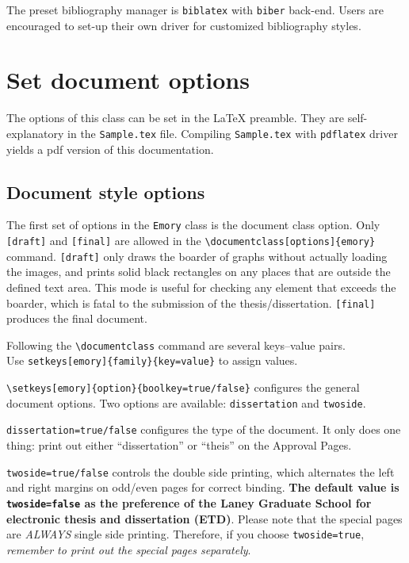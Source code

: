 \documentclass[final]{emory}
\begin{document}
The preset bibliography manager is \Verb|biblatex| with \Verb|biber| back-end. 
Users are encouraged to set-up their own \BibTeX{} driver for customized bibliography styles.


\section{Set document options}\label{sec:options}
The options of this class can be set in the \LaTeX{} preamble. They are 
self-explanatory in the \Verb|Sample.tex| file.
Compiling \Verb|Sample.tex| with \Verb|pdflatex| driver yields a pdf version of this documentation.

\subsection{Document style options}
The first set of options in the \Verb|Emory| class is the document class option.
Only \Verb|[draft]| and \Verb|[final]| are allowed in the 
\Verb|\documentclass[options]{emory}| command.
\Verb|[draft]| only draws the boarder of graphs without actually loading the images,
and prints solid black rectangles on any places that are outside the defined text area. 
This mode is useful for checking any element that exceeds the boarder,
which is fatal to the submission of the thesis/dissertation.
\Verb|[final]| produces the final document. 

Following the \Verb|\documentclass| command are several keys--value pairs.\\
Use \Verb|setkeys[emory]{family}{key=value}| to assign values.

\Verb|\setkeys[emory]{option}{boolkey=true/false}| configures the general document options.
Two options are available: \Verb|dissertation| and \Verb|twoside|.

\Verb|dissertation=true/false| configures the type of the document. 
It only does one thing: print out either ``dissertation'' or ``theis'' on the 
Approval Pages.

\Verb|twoside=true/false| controls the double side printing, which alternates the left and right margins on odd/even pages for correct binding.
\textbf{The default value is \Verb|twoside=false| as the preference of the Laney Graduate School for electronic thesis and dissertation (ETD)}. 
Please note that the special pages are \emph{ALWAYS} single side printing. 
Therefore, if you choose \Verb|twoside=true|, \emph{remember to print out the special pages separately}.
\end{document}

